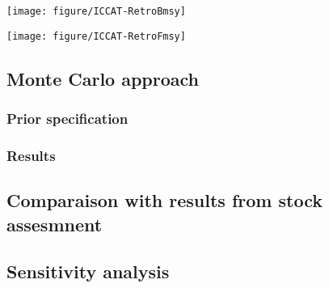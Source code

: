 {\centering \texttt{[image: figure/ICCAT-RetroBmsy]} 

}



{\centering \texttt{[image: figure/ICCAT-RetroFmsy]} 

}

\subsection{Monte Carlo approach}
\subsubsection{Prior specification}
\subsubsection{Results}

\subsection{Comparaison with results from stock assesmnent}

\subsection{Sensitivity analysis}